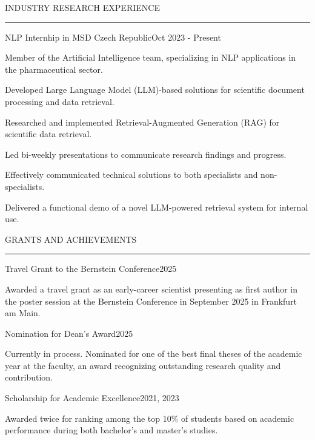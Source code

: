 \documentclass{resume} %
\renewenvironment{rSection}[1]{
\sectionskip
\textcolor{CarnegieMellonRed}{\MakeUppercase{#1}}
\sectionlineskip
\hrule
\begin{list}{}{
\setlength{\leftmargin}{1.5em}
}
\item[]
}{
\end{list}
}
\begin{document}
\begin{rSection}{Industry Research Experience}
\begin{rProject}{\large NLP Internhip in MSD Czech Republic}{Oct 2023 - Present}
{}{}
    \item Member of the Artificial Intelligence team, specializing in NLP applications
    in the pharmaceutical sector.
    \item Developed Large Language Model (LLM)-based solutions for scientific document
    processing and data retrieval.
    \item Researched and implemented Retrieval-Augmented Generation (RAG) 
    for scientific data retrieval.
    \item Led bi-weekly presentations to communicate research findings and progress.
    \item Effectively communicated technical solutions to both specialists and 
    non-specialists.
    \item Delivered a functional demo of a novel LLM-powered retrieval system 
    for internal use.
\end{rProject}

\end{rSection}



\begin{rSection}{Grants and Achievements} \itemsep -2pt

\begin{rProject}{\large Travel Grant to the Bernstein Conference}{2025}{}{}
    \item Awarded a travel grant as an early-career scientist presenting as first author in the poster session at the Bernstein Conference in September 2025 in Frankfurt am Main.
\end{rProject}

\begin{rProject}{\large Nomination for Dean's Award}{2025}{}{}
    \item Currently in process. Nominated for one of the best final theses of the academic year at the faculty, an award recognizing outstanding research quality and contribution.
\end{rProject}

\begin{rProject}{Scholarship for Academic Excellence}{2021, 2023}{}{}
    \item Awarded twice for ranking among the top 10\% of students based on academic performance during both bachelor's and master's studies.
\end{rProject}

\end{rSection}
\end{document}

